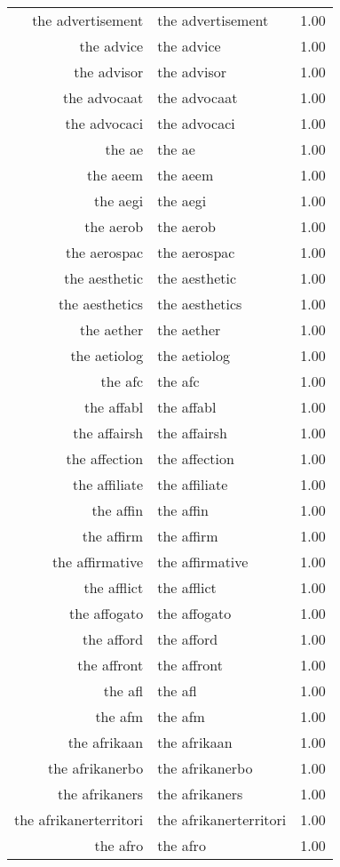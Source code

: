 \begin{table}[ht]
\begin{tabular}{rlr}
  the advertisement & the advertisement & 1.00 \\ 
  the advice & the advice & 1.00 \\ 
  the advisor & the advisor & 1.00 \\ 
  the advocaat & the advocaat & 1.00 \\ 
  the advocaci & the advocaci & 1.00 \\ 
  the ae & the ae & 1.00 \\ 
  the aeem & the aeem & 1.00 \\ 
  the aegi & the aegi & 1.00 \\ 
  the aerob & the aerob & 1.00 \\ 
  the aerospac & the aerospac & 1.00 \\ 
  the aesthetic & the aesthetic & 1.00 \\ 
  the aesthetics & the aesthetics & 1.00 \\ 
  the aether & the aether & 1.00 \\ 
  the aetiolog & the aetiolog & 1.00 \\ 
  the afc & the afc & 1.00 \\ 
  the affabl & the affabl & 1.00 \\ 
  the affairsh & the affairsh & 1.00 \\ 
  the affection & the affection & 1.00 \\ 
  the affiliate & the affiliate & 1.00 \\ 
  the affin & the affin & 1.00 \\ 
  the affirm & the affirm & 1.00 \\ 
  the affirmative & the affirmative & 1.00 \\ 
  the afflict & the afflict & 1.00 \\ 
  the affogato & the affogato & 1.00 \\ 
  the afford & the afford & 1.00 \\ 
  the affront & the affront & 1.00 \\ 
  the afl & the afl & 1.00 \\ 
  the afm & the afm & 1.00 \\ 
  the afrikaan & the afrikaan & 1.00 \\ 
  the afrikanerbo & the afrikanerbo & 1.00 \\ 
  the afrikaners & the afrikaners & 1.00 \\ 
  the afrikanerterritori & the afrikanerterritori & 1.00 \\ 
  the afro & the afro & 1.00 \\ 

\end{tabular}
\end{table}
